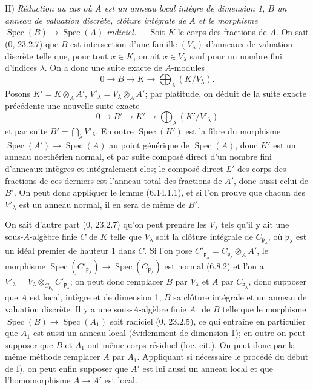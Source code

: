 II) \emph{Réduction au cas où $A$ est un anneau local intègre de dimension
1, $B$ un anneau de valuation discrète, clôture intégrale de $A$ et le
morphisme $\operatorname{Spec}(B)\to\operatorname{Spec}(A)$ radiciel.} ---
Soit $K$ le corps des fractions de $A$. On sait (0, 23.2.7) que $B$ est
intersection d'une famille $(V_\lambda)$ d'anneaux de valuation discrète
telle que, pour tout $x\in K$, on ait $x\in V_\lambda$ sauf pour un nombre
fini d'indices $\lambda$. On a donc une suite exacte de $A$-modules
\[
0\longrightarrow B\longrightarrow K\longrightarrow
\bigoplus_\lambda(K/V_\lambda).
\]
Posons $K'=K\otimes_A A'$, $V'_\lambda=V_\lambda\otimes_A A'$; par
platitude, on déduit de la suite exacte précédente une nouvelle suite
exacte
\[
0\longrightarrow B'\longrightarrow K'\longrightarrow
\bigoplus_\lambda(K'/V'_\lambda)
\]
et par suite $B'=\bigcap_\lambda V'_\lambda$. En outre
$\operatorname{Spec}(K')$ est la fibre du morphisme
$\operatorname{Spec}(A')\to\operatorname{Spec}(A)$ au point générique de
$\operatorname{Spec}(A)$, donc $K'$ est un anneau noethérien normal, et par
suite composé direct d'un nombre fini d'anneaux intègres et intégralement
clos; le composé direct $L'$ des corps des fractions de ces derniers est
l'anneau total des fractions de $A'$, donc aussi celui de $B'$. On peut donc
appliquer le lemme (6.14.1.1), et si l'on prouve que chacun des
$V'_\lambda$ est un anneau normal, il en sera de même de $B'$.

On sait d'autre part (0, 23.2.7) qu'on peut prendre les $V_\lambda$ tels
qu'il y ait une sous-$A$-algèbre finie $C$ de $K$ telle que $V_\lambda$
soit la clôture intégrale de $C_{\mathfrak p_\lambda}$, où
$\mathfrak p_\lambda$ est un idéal premier de hauteur 1 dans $C$. Si l'on
pose $C'_{\mathfrak p_\lambda}=C_{\mathfrak p_\lambda}\otimes_A A'$, le
morphisme $\operatorname{Spec}(C'_{\mathfrak p_\lambda})\to
\operatorname{Spec}(C_{\mathfrak p_\lambda})$ est normal (6.8.2) et l'on a
$V'_\lambda=V_\lambda\otimes_{C_{\mathfrak p_\lambda}}
C'_{\mathfrak p_\lambda}$; on peut donc remplacer $B$ par $V_\lambda$ et
$A$ par $C_{\mathfrak p_\lambda}$, donc supposer que $A$ est local, intègre
et de dimension 1, $B$ sa clôture intégrale et un anneau de valuation
discrète. Il y a une sous-$A$-algèbre finie $A_1$ de $B$ telle que le
morphisme $\operatorname{Spec}(B)\to\operatorname{Spec}(A_1)$ soit radiciel
(0, 23.2.5), ce qui entraîne en particulier que $A_1$ est aussi un anneau
local (évidemment de dimension 1); en outre on peut supposer que $B$ et
$A_1$ ont même corps résiduel (loc. cit.). On peut donc par la même méthode
remplacer $A$ par $A_1$. Appliquant si nécessaire le procédé du début de
I), on peut enfin supposer que $A'$ est lui aussi un anneau local et que
l'homomorphisme $A\to A'$ est local.

